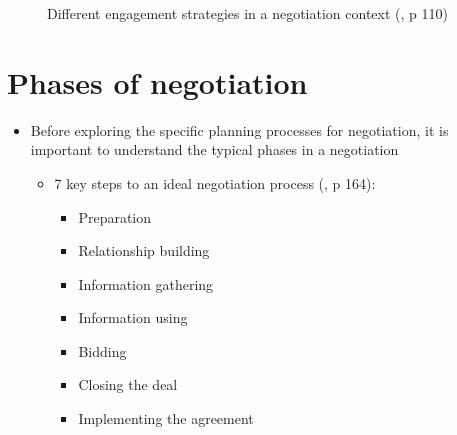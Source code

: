 \documentclass[
  ignorenonframetext,
]{beamer}
\providecommand{\tightlist}{%
  \setlength{\itemsep}{0pt}\setlength{\parskip}{0pt}}\usepackage{longtable,booktabs,array}
\begin{document}
\begin{frame}{}
\label{section-7}
\begin{figure}


\caption{\label{fig-engagement-strategies}Different engagement
strategies in a negotiation context
(, p 110)}

\end{figure}%
\end{frame}

\section{Phases of negotiation}\label{phases-of-negotiation}

\begin{frame}{}
\label{section-8}
\begin{itemize}
\item
  Before exploring the specific planning processes for negotiation, it
  is important to understand the typical phases in a negotiation

  \begin{itemize}
  \item
    7 key steps to an ideal negotiation process
    (, p 164):

    \begin{itemize}
    \tightlist
    \item
      Preparation
    \item
      Relationship building
    \item
      Information gathering
    \item
      Information using
    \item
      Bidding
    \item
      Closing the deal
    \item
      Implementing the agreement
    \end{itemize}
  \end{itemize}
\end{itemize}
\end{frame}
\end{document}

